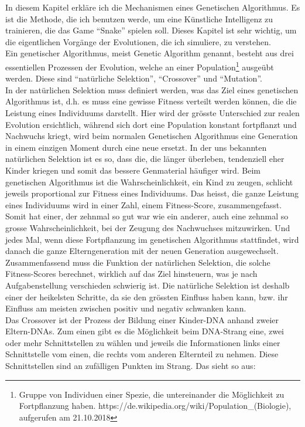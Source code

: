 \documentclass[11pt,a4paper,ngerman]{article}
\begin{document}
In diesem Kapitel erkläre ich die Mechanismen eines Genetischen Algorithmus. Es ist die Methode, die ich benutzen werde, um eine Künstliche Intelligenz zu trainieren, die das Game \enquote{Snake} spielen soll. Dieses Kapitel ist sehr wichtig, um die eigentlichen Vorgänge der Evolutionen, die ich simuliere, zu verstehen.\\ 

Ein genetischer Algorithmus, meist Genetic Algorithm genannt, besteht aus drei essentiellen Prozessen der Evolution, welche an einer Population\footnote{Gruppe von Individuen einer Spezie, die untereinander die Möglichkeit zu Fortpflanzung haben. https://de.wikipedia.org/wiki/Population\_(Biologie), aufgerufen am 21.10.2018} ausgeübt werden. Diese sind \enquote{natürliche Selektion}, \enquote{Crossover} und \enquote{Mutation}.\\

In der natürlichen Selektion muss definiert werden, was das Ziel eines genetischen Algorithmus ist, d.h. es muss eine gewisse Fitness verteilt werden können, die die Leistung eines Individuums darstellt. Hier wird der grösste Unterschied zur realen Evolution ersichtlich, während sich dort eine Population konstant fortpflanzt und Nachwuchs kriegt, wird beim normalen Genetischen Algorithmus eine Generation in einem einzigen Moment durch eine neue ersetzt. In der uns bekannten natürlichen Selektion ist es so, dass die, die länger überleben, tendenziell eher Kinder kriegen und somit das bessere Genmaterial häufiger wird. Beim genetischen Algorithmus ist die Wahrscheinlichkeit, ein Kind zu zeugen, schlicht jeweils proportional zur Fitness eines Individuums. Das heisst, die ganze Leistung eines Individuums wird in einer Zahl, einem Fitness-Score, zusammengefasst. Somit hat einer, der zehnmal so gut war wie ein anderer, auch eine zehnmal so grosse Wahrscheinlichkeit, bei der Zeugung des Nachwuchses mitzuwirken. Und jedes Mal, wenn diese Fortpflanzung im genetischen Algorithmus stattfindet, wird danach die ganze Elterngeneration mit der neuen Generation ausgewechselt. Zusammenfassend muss die Funktion der natürlichen Selektion, die solche Fitness-Scores berechnet, wirklich auf das Ziel hinsteuern, was je nach Aufgabenstellung verschieden schwierig ist. Die natürliche Selektion ist deshalb einer der heikelsten Schritte, da sie den grössten Einfluss haben kann, bzw. ihr Einfluss am meisten zwischen positiv und negativ schwanken kann.\\

Das Crossover ist der Prozess der Bildung einer Kinder-DNA anhand zweier Eltern-DNAs. Zum einen gibt es die Möglichkeit beim DNA-Strang eine, zwei oder mehr Schnittstellen zu wählen und jeweils die Informationen links einer Schnittstelle vom einen, die rechts vom anderen Elternteil zu nehmen. Diese Schnittstellen sind an zufälligen Punkten im Strang. Das sieht so aus:
\end{document}
